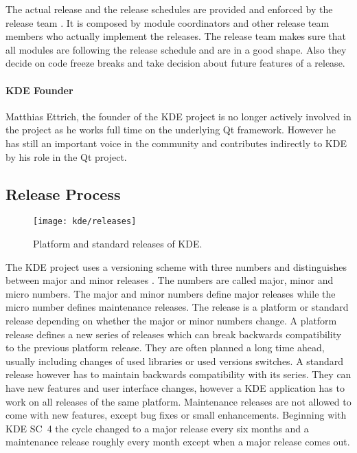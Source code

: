 The actual release and the release schedules are provided and enforced by the
release team \cite{KDEReleaseTeam}. It is composed by module coordinators and
other release team members who actually implement the releases. The release
team makes sure that all modules are following the release schedule and are in
a good shape. Also they decide on code freeze breaks and take decision about
future features of a release.

\paragraph{KDE Founder}

Matthias Ettrich, the founder of the KDE project is no longer actively involved
in the project as he works full time on the underlying Qt framework. However he
has still an important voice in the community and contributes indirectly to KDE
by his role in the Qt project.


\subsection{Release Process} %

\begin{figure}[htbp]
  \centering
  \texttt{[image: kde/releases]}
  \caption[Major Releases of KDE]{Platform and standard releases of KDE.}
\end{figure}

The KDE project uses a versioning scheme with three numbers and distinguishes
between major and minor releases
\cite{KDEReleaseTeam,KDEReleaseSchedule,KDESchedule}. The numbers are called
major, minor and micro numbers. The major and minor numbers define major
releases while the micro number defines maintenance releases. The release is a
platform or standard release depending on whether the major or minor numbers
change. A platform release defines a new series of releases which can break
backwards compatibility to the previous platform release. They are often
planned a long time ahead, usually including changes of used libraries or used
versions switches. A standard release however has to maintain backwards
compatibility with its series. They can have new features and user interface
changes, however a KDE application has to work on all releases of the same
platform. Maintenance releases are not allowed to come with new features,
except bug fixes or small enhancements. Beginning with \ac{KDE SC}~4 the cycle
changed to a major release every six months and a maintenance release roughly
every month except when a major release comes out.

